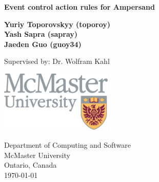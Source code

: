 \begin{titlepage}
    \begin{center}
        \vspace*{1cm}
        
        \textbf{ Event control action rules for Ampersand}
        
             
        \vspace{1.5cm}
        
        \textbf{Yuriy Toporovskyy (toporoy)\\ Yash Sapra (sapray) \\ Jaeden Guo 
    (guoy34)}
        
        \vfill
        
        Supervised by: Dr. Wolfram Kahl
        
        \vspace{0.8cm}
        
        \includegraphics[width=0.4\textwidth]{../figures/mac_logo.jpg}
        
        Department of Computing and Software\\
        McMaster University\\
        Ontario, Canada\\
        \today
        
    \end{center}
\end{titlepage}